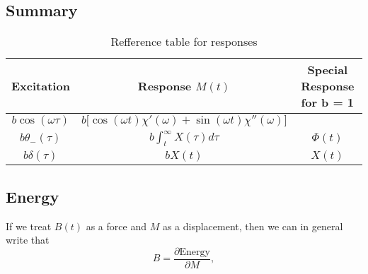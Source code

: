  
 \subsection{Summary}
 \begin{table}[h]
 	\centering
 	\caption{Refference table for responses\label{tab:responses}}
 	\begin{tabular}{|c|c|c|}
 		\hline\textbf{Excitation} & \textbf{Response} $ M(t) $ & \textbf{Special Response for b = 1}\\\hline
 		$ b\cos(\omega \tau) $ & $ b\big[{\cos(\omega t)\chi'(\omega)} + {\sin(\omega t)\chi''(\omega)}\big] $ & \\
 		$ b\theta_-(\tau) $ & $ b\int_{t}^{\infty}X(\tau)d\tau $ & $ \Phi(t) $\\
 		$ b\delta(\tau) $ & $ bX(t) $ & $ X(t) $\\\hline
 	\end{tabular}
 \end{table}
 
 
\subsection{Energy}
 If we treat $ B(t) $ as a force and $ M $ as a displacement, then we can in general write that
 \begin{equation}\label{eqn:energy_1}
 B = \frac{\partial\text{Energy}}{\partial M},
 \end{equation}	
 
